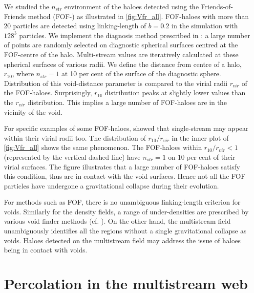 We studied the $n_{str}$ environment of the haloes detected using the Friends-of-Friends method (FOF-\citealt{Davis1985}) as illustrated in \autoref{fig:Vfr_all}. FOF-haloes with more than 20 particles are detected using linking-length of $b=0.2$ in the simulation with $128^3$ particles. We implement the diagnosis method prescribed in \cite{Ramachandra2015}: a large number of points are randomly selected on diagnostic spherical surfaces centred at the FOF-centre of the halo. Multi-stream values are iteratively calculated at these spherical surfaces of various radii. We define the distance from centre of a halo, $r_{10}$, where $n_{str} = 1$ at 10 per cent of the surface of the diagnostic sphere. Distribution of this void-distance parameter is compared to the virial radii $r_{vir}$ of the FOF-haloes. Surprisingly, $r_{10}$ distribution peaks at slightly lower values than the $r_{vir}$ distribution. This implies a large number of FOF-haloes are in the vicinity of the void. 

For specific examples of some FOF-haloes, \cite{Ramachandra2015} showed that single-stream may appear within their virial radii too. The distribution of $r_{10}/r_{vir}$ in the inner plot of \autoref{fig:Vfr_all} shows the same phenomenon. The FOF-haloes within $r_{10}/r_{vir} < 1$ (represented by the vertical dashed line) have $n_{str} = 1$ on 10 per cent of their virial surfaces. The figure illustrates that a large number of FOF-haloes satisfy this condition, thus are in contact with the void surfaces. Hence not all the FOF particles have undergone a gravitational collapse during their evolution. 


For methods such as FOF, there is no unambiguous linking-length criterion for voids. Similarly for the density fields, a range of under-densities are prescribed by various void finder methods (cf. \citealt{Colberg2008}). On the other hand, the multistream field unambiguously identifies all the regions without a single gravitational collapse as voids. Haloes detected on the multistream field may address the issue of haloes being in contact with voids. 

\section{Percolation in the multistream web}
\label{sec:percolation}

